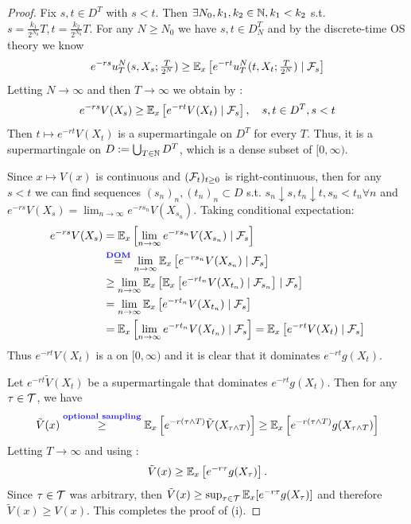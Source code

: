 \begin{proof}
    Fix $s, t \in D^T$ with $s < t$. Then $\exists N_0, k_1, k_2 \in \mathbb N, k_1 < k_2$ s.t. $s = \frac{k_1}{2^{N_0}} T, t = \frac{k_2}{2^{N_0}} T$. For any $N \geq N_0$ we have $s, t \in D_N^T$ and by the discrete-time OS theory we know 
    \[ e^{-rs} u_T^N(s, X_s; \tfrac{T}{2^N}) \geq \mathbb E_x \left[ e^{-rt} u_T^N(t, X_t; \tfrac{T}{2^N}) \mid \mathcal{F}_s \right] \]
    Letting $N \to \infty$ and then $T \to \infty$ we obtain by :
    \[ e^{-rs} V(X_s) \geq \mathbb E_x \left[ e^{-rt} V(X_t) \mid \mathcal{F}_s \right], \quad s, t \in D^T, s < t \]
    Then $t \mapsto e^{-rt} V(X_t)$ is a supermartingale on $D^T$ for every $T$. Thus, it is a supermartingale on $D := \bigcup_{T \in \mathbb N} D^T$, which is a dense subset of $[0, \infty)$.

    Since $x \mapsto V(x)$ is continuous and $(\mathcal{F}_t)_{t \geq 0}$ is right-continuous, then for any $s < t$ we can find sequences $(s_n)_n, (t_n)_n \subset D$ s.t. $s_n \downarrow s, t_n \downarrow t, s_n < t_n \forall n$ and $e^{-rs} V(X_s) = \lim_{n \to \infty} e^{-rs_n} V(X_{s_n})$. Taking conditional expectation:
\begin{align*}
    e^{-rs} V(X_s) &= \EE_x \left[ \lim_{n \to \infty} e^{-rs_n} V(X_{s_n}) \mid \mc{F}_s \right] \\
    &\overset{\text{\vocab{DOM}}}{=} \lim_{n \to \infty} \EE_x \left[ e^{-rs_n} V(X_{s_n}) \mid \mc{F}_s \right] \\
    &\geq \lim_{n \to \infty} \EE_x \left[ \EE_x \left[ e^{-rt_n} V(X_{t_n}) \mid \mc{F}_{s_n} \right] \mid \mc{F}_s \right] \\
    &= \lim_{n \to \infty} \EE_x \left[ e^{-rt_n} V(X_{t_n}) \mid \mc{F}_s \right] \\
    &= \EE_x \left[ \lim_{n \to \infty} e^{-rt_n} V(X_{t_n}) \mid \mc{F}_s \right] = \EE_x \left[ e^{-rt} V(X_t) \mid \mc{F}_s \right]
\end{align*}
Thus $e^{-rt} V(X_t)$ is a  on $[0, \infty)$ and it is clear that it dominates $e^{-rt} g(X_t)$.

Let $e^{-rt} \tilde{V}(X_t)$ be a supermartingale that dominates $e^{-rt} g(X_t)$. Then for any $\tau \in \mathcal{T}$, we have
\[ \tilde{V}(x) \overset{\text{\vocab{optional sampling}}}{\geq} \EE_x \left[ e^{-r(\tau \wedge T)} \tilde{V}(X_{\tau \wedge T}) \right] \geq \EE_x \left[ e^{-r(\tau \wedge T)} g(X_{\tau \wedge T}) \right] \]
Letting $T \to \infty$ and using :
\[ \tilde{V}(x) \geq \mathbb E_x \left[ e^{-r\tau} g(X_\tau) \right]. \]
Since $\tau \in \mathcal{T}$ was arbitrary, then $\tilde{V}(x) \geq \sup_{\tau \in \mathcal{T}} \mathbb E_x [ e^{-r\tau} g(X_\tau) ]$ and therefore $\tilde{V}(x) \geq V(x)$. This completes the proof of (i).


\end{proof}
